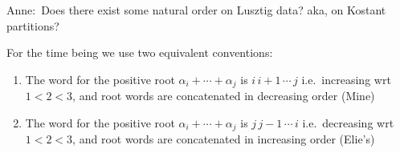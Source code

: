 \documentclass[11pt]{article}
\newcommand{\anne}[1]{{\color{pink!50!blue}Anne:~#1}}
\begin{document}
\anne{Does there exist some natural order on Lusztig data? aka, on Kostant partitions?}

For the time being we use two equivalent conventions:
\begin{enumerate}
    \item {\color{red}The word for the positive root $\alpha_i + \cdots + \alpha_j$ is $i\,i+1\,\cdots\,j$ i.e.\ increasing wrt $1 < 2 < 3$, and root words are concatenated in decreasing order} (Mine)
    \item {\color{blue}The word for the positive root $\alpha_i + \cdots + \alpha_j$ is $j\,j-1\,\cdots\,i$ i.e.\ decreasing wrt $1 < 2 < 3$, and root words are concatenated in increasing order} (Elie's)
\end{enumerate}
\end{document}
